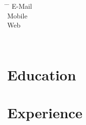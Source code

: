 \documentclass[12pt]{report} %
\begin{document}






\begin{minipage}{0.45\textwidth}
\begin{tabbing}
\hspace{3cm} \= \hspace{4cm} \= \kill %
E-Mail  \> \href{mailto:\varEmail}{\varEmail} \\
Mobile  \> \varMobile \\
\DoIfNotEmpty{\varWeb}
{Web \> \href{\varWeb}{\varWeb} \\}%
\end{tabbing}
\end{minipage}%
\hfill
\begin{minipage}{0.3\textwidth}%
\varAddress \\%
\end{minipage}%



\section{Education}

\education{}
\begin{list}{}%
         {\setlength{\leftmargin}{0.19\linewidth}}%
         \item[]%
{\small{\color{gray}\varEducationInfo{}}}
\end{list}



\section{Experience}
\professional{}


\end{document}
